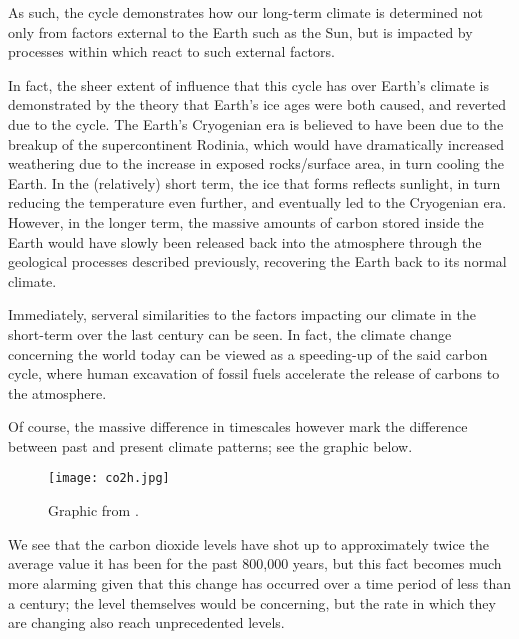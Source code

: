 \documentclass{article}
\theoremstyle{definition}
\begin{document}
As such, the cycle demonstrates how our long-term climate is determined not only from factors external to the Earth such as the Sun, but is impacted by processes within which react to such external factors.

In fact, the sheer extent of influence that this cycle has over Earth's climate is demonstrated by the theory that Earth's ice ages were both caused, and reverted due to the cycle. The Earth's Cryogenian era is believed to have been due to the breakup of the supercontinent Rodinia, which would have dramatically increased weathering due to the increase in exposed rocks/surface area, in turn cooling the Earth. In the (relatively) short term, the ice that forms reflects sunlight, in turn reducing the temperature even further, and eventually led to the Cryogenian era. However, in the longer term, the massive amounts of carbon stored inside the Earth would have slowly been released back into the atmosphere through the geological processes described previously, recovering the Earth back to its normal climate\cite{ash}.

Immediately, serveral similarities to the factors impacting our climate in the short-term over the last century can be seen. In fact, the climate change concerning the world today can be viewed as a speeding-up of the said carbon cycle, where human excavation of fossil fuels accelerate the release of carbons to the atmosphere.

Of course, the massive difference in timescales however mark the difference between past and present climate patterns; see the graphic below.
\begin{figure}[h]
	\centering
	\texttt{[image: co2h.jpg]}
	\caption{Graphic from \cite{co2}.}
\end{figure}
We see that the carbon dioxide levels have shot up to approximately twice the average value it has been for the past 800,000 years, but this fact becomes much more alarming given that this change has occurred over a time period of less than a century; the level themselves would be concerning, but the rate in which they are changing also reach unprecedented levels.


\newpage

\end{document}
